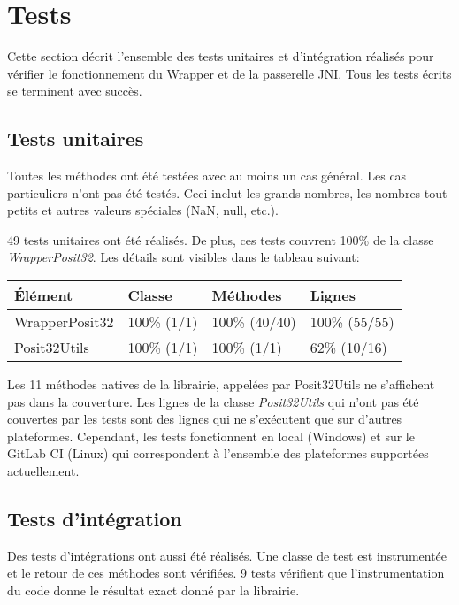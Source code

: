 \section{Tests}

Cette section décrit l'ensemble des tests unitaires et d'intégration réalisés pour vérifier le fonctionnement du \gls{Wrapper} et de la passerelle \gls{JNI}. Tous les tests écrits se terminent avec succès.

\subsection{Tests unitaires}

Toutes les méthodes ont été testées avec au moins un cas général. Les cas particuliers n'ont pas été testés. Ceci inclut les grands nombres, les nombres tout petits et autres valeurs spéciales (NaN, null, etc.).

49 tests unitaires ont été réalisés. De plus, ces tests couvrent 100\% de la classe \textit{WrapperPosit32}. Les détails sont visibles dans le tableau suivant:

\begin{table}[h]
    \begin{tabularx}{\columnwidth}{ | p{12em} | X | X | X |}
        \hline
        \textbf{Élément} & \textbf{Classe} & \textbf{Méthodes} & \textbf{Lignes} \\
        \hline
        WrapperPosit32 & 100\% (1/1) & 100\% (40/40) & 100\% (55/55) \\
        Posit32Utils & 100\% (1/1) & 100\% (1/1) & 62\% (10/16) \\
        \hline
    \end{tabularx}
\end{table}

Les 11 méthodes natives de la librairie, appelées par Posit32Utils ne s'affichent pas dans la couverture. Les lignes de la classe \textit{Posit32Utils} qui n'ont pas été couvertes par les tests sont des lignes qui ne s'exécutent que sur d'autres plateformes. Cependant, les tests fonctionnent en local (Windows) et sur le GitLab CI (Linux) qui correspondent à l'ensemble des plateformes supportées actuellement.

\subsection{Tests d'intégration}

Des tests d'intégrations ont aussi été réalisés. Une classe de test est instrumentée et le retour de ces méthodes sont vérifiées. 9 tests vérifient que l'instrumentation du code donne le résultat exact donné par la librairie.
